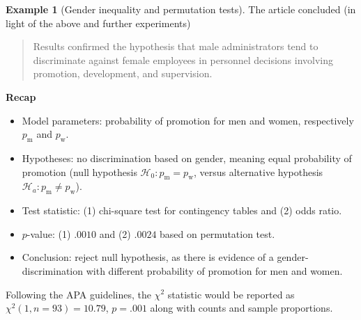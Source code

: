 \documentclass[
  11pt,
  letterpaper,
]{scrbook}
\providecommand{\tightlist}{%
  \setlength{\itemsep}{0pt}\setlength{\parskip}{0pt}}\usepackage{longtable,booktabs,array}
\theoremstyle{definition}
\newtheorem{example}{Example}[chapter]
\theoremstyle{remark}
\begin{document}
\begin{example}[Gender inequality and permutation
tests]
The article concluded (in light of the above and further experiments)

\begin{quote}
Results confirmed the hypothesis that male administrators tend to
discriminate against female employees in personnel decisions involving
promotion, development, and supervision.
\end{quote}

\textbf{Recap}

\begin{itemize}
\tightlist
\item
  Model parameters: probability of promotion for men and women,
  respectively \(p_{\text{m}}\) and \(p_{\text{w}}\).
\item
  Hypotheses: no discrimination based on gender, meaning equal
  probability of promotion (null hypothesis
  \(\mathscr{H}_0: p_{\text{m}}=p_{\text{w}}\), versus alternative
  hypothesis \(\mathscr{H}_a: p_{\text{m}}\neq p_{\text{w}}\)).
\item
  Test statistic: (1) chi-square test for contingency tables and (2)
  odds ratio.
\item
  \(p\)-value: (1) \(.0010\) and (2) \(.0024\) based on permutation
  test.
\item
  Conclusion: reject null hypothesis, as there is evidence of a
  gender-discrimination with different probability of promotion for men
  and women.
\end{itemize}

Following the APA guidelines, the \(\chi^2\) statistic would be reported
as \(\chi^2(1, n = 93) = 10.79\), \(p = .001\) along with counts and
sample proportions.

\end{example}
\end{document}
